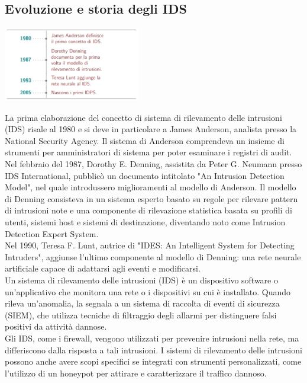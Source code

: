 \documentclass[12pt,a4paper,oneside,onecolumn,openright]{book}
\begin{document}
	\subsection{Evoluzione e storia degli IDS}
	\begin{table}
		\includegraphics[width=0.45\textwidth]{image/IDStimeline.png}
	\end{table} 
	La prima elaborazione del concetto di sistema di rilevamento delle intrusioni (IDS) risale al 1980 e si deve in particolare a James Anderson, analista presso la National Security Agency. Il sistema di Anderson comprendeva un insieme di strumenti per amministratori di sistema per poter esaminare i registri di audit.\cite{ComputerSecurityThreat}\\
	Nel febbraio del 1987, Dorothy E. Denning, assistita da Peter G. Neumann presso IDS International, pubblicò un documento intitolato "An Intrusion Detection Model", nel quale introdussero miglioramenti al modello di Anderson.\cite{AnIntrusionDetectionModel}
	Il modello di Denning consisteva in un sistema esperto basato su regole per rilevare pattern di intrusioni note e una componente di rilevazione statistica basata su profili di utenti, sistemi host e sistemi di destinazione, diventando noto come Intrusion Detection Expert System.\\
	Nel 1990, Teresa F. Lunt, autrice di "IDES: An Intelligent System for Detecting Intruders", aggiunse l'ultimo componente al modello di Denning: una rete neurale artificiale capace di adattarsi agli eventi e modificarsi.\cite{IDES} \\
	Un sistema di rilevamento delle intrusioni (IDS) è un dispositivo software o un'applicativo che monitora una rete o i dispositivi su cui è installato. Quando rileva un'anomalia, la segnala a un sistema di raccolta di eventi di sicurezza (SIEM), che utilizza tecniche di filtraggio degli allarmi per distinguere falsi positivi da attività dannose.\cite{taxonomy}\\
	Gli IDS, come i firewall, vengono utilizzati per prevenire intrusioni nella rete, ma differiscono dalla risposta a tali intrusioni. I sistemi di rilevamento delle intrusioni possono anche avere scopi specifici se integrati con strumenti personalizzati, come l'utilizzo di un honeypot per attirare e caratterizzare il traffico dannoso.\cite{idsFirewall}\\
\end{document}
